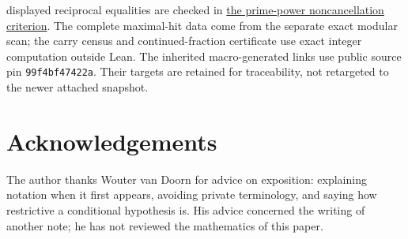 \documentclass[11pt]{article}
\renewcommand{\commitshort}{99f4bf47422a}
\begin{document}
displayed reciprocal equalities are checked in
\href{https://github.com/wcook04/plectis-erdos/blob/f36a98bf3d3e6f65f1074e3b800e3293d5b8a51a/ErdosProblems/Erdos68/PrimePoleCriterion.lean}{the prime-power noncancellation criterion}.  The complete maximal-hit data come from the separate
exact modular scan; the carry census and continued-fraction certificate use
exact integer computation outside Lean.  The inherited macro-generated links use public source pin
\texttt{\commitshort}. Their targets are retained for traceability, not
retargeted to the newer attached snapshot.
\par
\endgroup

\section*{Acknowledgements}
The author thanks Wouter van Doorn for advice on exposition: explaining notation when it first appears, avoiding private terminology, and saying how restrictive a conditional hypothesis is. His advice concerned the writing of another note; he has not reviewed the mathematics of this paper.
\end{document}
